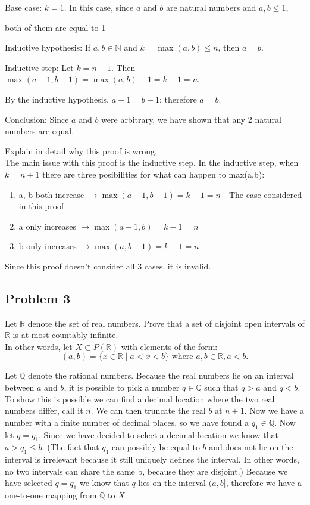 \documentclass{article}
\begin{document}
    Base case: $k = 1$.  In this case, since $a$ and $b$ are natural numbers and $a,b\le 1$,

    both of them are equal to 1

    Inductive hypothesis:  If $a,b\in\mathbb{N}$ and $k = \max(a,b) \le n$, then $a = b$.

    Inductive step: Let $k = n+1$. Then $\max(a-1,b-1) = \max(a,b)-1 = k-1 = n$.

    By the inductive hypothesis, $a-1 = b-1$; therefore $a = b$.

    Conclusion:  Since $a$ and $b$ were arbitrary, we have shown that any 2 natural numbers are equal.

    Explain in detail why this proof is wrong.\\[5pt]

    The main issue with this proof is the inductive step. In the inductive step, when $k=n+1$ there are three
    posibilities for what can happen to max(a,b):
    \begin{enumerate}[1)]
    \item a, b both increase $\rightarrow \max(a-1,b-1) = k-1 = n$ - The case considered in this proof
    \item a only increases $\rightarrow \max(a-1,b) = k-1 = n$
    \item b only increases $\rightarrow \max(a, b-1) = k-1 =n$
    \end{enumerate}

    Since this proof doesn't consider all 3 cases, it is invalid.

\pagebreak
\subsection*{Problem 3}

Let $\mathbb{R}$ denote the set of real numbers. Prove that a set of disjoint open intervals of $\mathbb{R}$
is at most countably infinite.\\

In other words, let $X \subset P(\mathbb{R})$ with elements of the form:
\[ (a,b)=\{ x\in\mathbb{R} \mid a<x<b \} \text{ where } a,b \in \mathbb{R}, a<b.\]

Let $\mathbb{Q}$ denote the rational numbers. Because the real numbers lie on an interval between $a$ and $b$, it is
possible to pick a number $q\in\mathbb{Q}$ such that $q > a$ and $q < b$. To show this is possible we can find a decimal
location where the two real numbers differ, call it $n$. We can then truncate the real $b$ at $n+1$.
Now we have a number with a finite number of decimal places, so we have found a $q_{1} \in \mathbb{Q}$.
Now let $q = q_{1}$. Since we have decided to select a decimal location
we know that $a > q_{1} \leq b$. (The fact that $q_{1}$ can possibly be equal to $b$
and does not lie on the interval is irrelevant because it still uniquely defines the interval.
In other words, no two intervals can share the same b, because they are disjoint.) Because we have selected $q = q_{1}$
we know that $q$
lies on the interval $(a, b]$, therefore we have a one-to-one mapping from $\mathbb{Q}$ to $X$.\\
\end{document}

